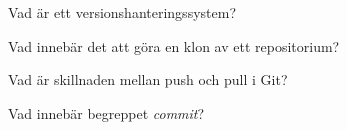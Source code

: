 \item Vad är ett versionshanteringssystem?
\qskip
\item Vad innebär det att göra en klon av ett repositorium?
\qskip
\item Vad är skillnaden mellan push och pull i Git?
\qskip
\item Vad innebär begreppet \emph{commit}?
